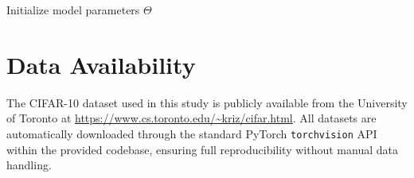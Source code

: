 \documentclass[journal,twoside]{IEEEtran}
\begin{document}
\begin{algorithm}[t]
\caption{Training of the Proposed Physics-Guided Neural Dynamics}
\label{alg:pgnd}


Initialize model parameters $\Theta$\;


\Return{$\Theta$}\;

\end{algorithm}


\section{Data Availability}

The CIFAR-10 dataset used in this study is publicly available from the University of Toronto at \url{https://www.cs.toronto.edu/~kriz/cifar.html}. All datasets are automatically downloaded through the standard PyTorch \texttt{torchvision} API within the provided codebase, ensuring full reproducibility without manual data handling.
\end{document}
